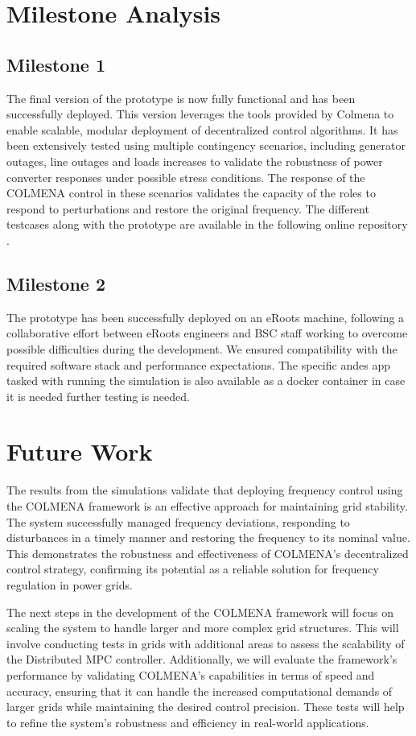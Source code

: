 \documentclass{article}
\begin{document}
\section{Milestone Analysis}

\subsection*{Milestone 1}

The final version of the prototype is now fully functional and has been successfully deployed. This version leverages the tools provided by Colmena to enable scalable, modular deployment of decentralized control algorithms. It has been extensively tested using multiple contingency scenarios, including generator outages, line outages and loads increases to validate the robustness of power converter responses under possible stress conditions. The response of the COLMENA control in these scenarios validates the capacity of the roles to respond to perturbations and restore the original frequency. The different testcases along with the prototype are available in the following online repository \cite{repo:colmenaeroots}.

\subsection*{Milestone 2}

The prototype has been successfully deployed on an eRoots machine, following a collaborative effort between eRoots engineers and BSC staff working to overcome possible difficulties during the development. We ensured compatibility with the required software stack and performance expectations. The specific andes app tasked with running the simulation is also available as a docker container in case it is needed further testing is needed. 

\section{Future Work}

The results from the simulations validate that deploying frequency control using the COLMENA framework is an effective approach for maintaining grid stability. The system successfully managed frequency deviations, responding to disturbances in a timely manner and restoring the frequency to its nominal value. This demonstrates the robustness and effectiveness of COLMENA's decentralized control strategy, confirming its potential as a reliable solution for frequency regulation in power grids.

The next steps in the development of the COLMENA framework will focus on scaling the system to handle larger and more complex grid structures. This will involve conducting tests in grids with additional areas to assess the scalability of the Distributed MPC controller. Additionally, we will evaluate the framework’s performance by validating COLMENA's capabilities in terms of speed and accuracy, ensuring that it can handle the increased computational demands of larger grids while maintaining the desired control precision. These tests will help to refine the system's robustness and efficiency in real-world applications.

\nocite{*}  
\printbibliography
\end{document}
